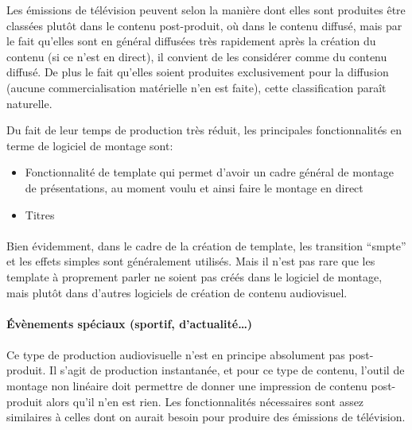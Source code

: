 Les émissions de télévision peuvent selon la manière dont elles sont produites être
classées plutôt dans le contenu post-produit, où dans le contenu diffusé, mais par le
fait qu'elles sont en général diffusées très rapidement après la création du contenu (si ce n'est en
direct), il convient de les considérer comme du contenu diffusé. De plus le fait qu'elles soient
produites exclusivement pour la diffusion (aucune commercialisation matérielle n'en est faite), cette
classification paraît naturelle.

Du fait de leur temps de production très réduit, les principales fonctionnalités en terme de logiciel
de montage sont:
\begin{itemize} \setlength{\itemsep}{2mm}
  \item{Fonctionnalité de template qui permet d'avoir un cadre général de montage de
    présentations, au moment voulu et ainsi faire le montage en direct}
  \item{Titres}
\end{itemize}

\paragraph{}

Bien évidemment, dans le cadre de la création de template, les transition ``smpte'' et les effets simples
sont généralement utilisés. Mais il n'est pas rare que les template à proprement parler ne soient pas créés
dans le logiciel de montage, mais plutôt dans d'autres logiciels de création de contenu audiovisuel.

\paragraph {Évènements spéciaux (sportif, d'actualité\ldots)}

\paragraph{}

Ce type de production audiovisuelle n'est en principe absolument pas post-produit. Il
s'agit de production instantanée, et pour ce type de contenu, l'outil de montage non
linéaire doit permettre de donner une impression de contenu post-produit alors
qu'il n'en est rien. Les fonctionnalités nécessaires sont assez similaires
à celles dont on aurait besoin pour produire des émissions de télévision.

\subparagraph{}

